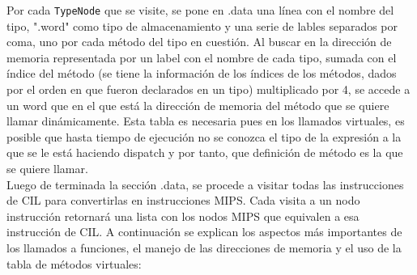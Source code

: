 \documentclass[a4paper,12pt]{article}
\def\code#1{\texttt{#1}}
\begin{document}
Por cada \code{TypeNode} que se visite, se pone en .data una línea con el nombre del tipo, ".word" como tipo de almacenamiento y una serie de lables separados por coma, uno por cada método del tipo en cuestión. Al buscar en la dirección de memoria representada por un label con el nombre de cada tipo, sumada con el índice del método (se tiene la información de los índices de los métodos, dados por el orden en que fueron declarados en un tipo) multiplicado por 4, se accede a un word que en el que está la dirección de memoria del método que se quiere llamar dinámicamente. Esta tabla es necesaria pues en los llamados virtuales, es posible que hasta tiempo de ejecución no se conozca el tipo de la expresión a la que se le está haciendo dispatch y por tanto, que definición de método es la que se quiere llamar.\\
Luego de terminada la sección .data, se procede a visitar todas las instrucciones de CIL para convertirlas en instrucciones MIPS. Cada visita a un nodo instrucción retornará una lista con los nodos MIPS que equivalen a esa instrucción de CIL. A continuación se explican los aspectos más importantes de los llamados a funciones, el manejo de las direcciones de memoria y el uso de la tabla de métodos virtuales:\\
\end{document}
